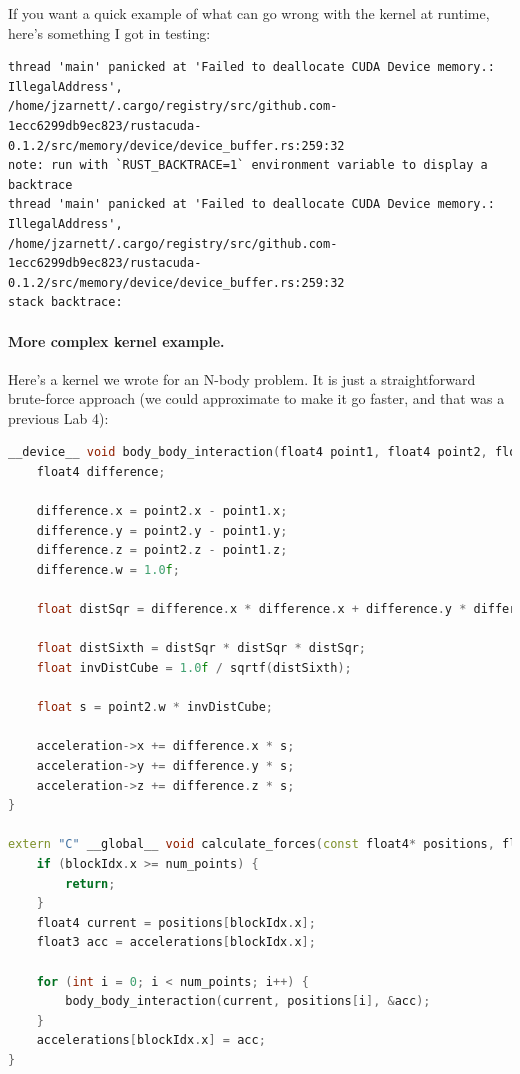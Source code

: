 \documentclass[a4paper]{report}
\begin{document}
If you want a quick example of what can go wrong with the kernel at runtime, here's something I got in testing:
{\scriptsize
\begin{verbatim}
thread 'main' panicked at 'Failed to deallocate CUDA Device memory.: IllegalAddress', 
/home/jzarnett/.cargo/registry/src/github.com-1ecc6299db9ec823/rustacuda-0.1.2/src/memory/device/device_buffer.rs:259:32
note: run with `RUST_BACKTRACE=1` environment variable to display a backtrace
thread 'main' panicked at 'Failed to deallocate CUDA Device memory.: IllegalAddress', 
/home/jzarnett/.cargo/registry/src/github.com-1ecc6299db9ec823/rustacuda-0.1.2/src/memory/device/device_buffer.rs:259:32
stack backtrace:
\end{verbatim}
}

\paragraph{More complex kernel example.} Here's a kernel we wrote for an N-body problem. It is just a straightforward brute-force approach (we could approximate to make it go faster, and that was a previous Lab 4):

\begin{lstlisting}[language=C++]
__device__ void body_body_interaction(float4 point1, float4 point2, float3 *acceleration) {
    float4 difference;

    difference.x = point2.x - point1.x;
    difference.y = point2.y - point1.y;
    difference.z = point2.z - point1.z;
    difference.w = 1.0f;

    float distSqr = difference.x * difference.x + difference.y * difference.y + difference.z * difference.z + 1e-10;

    float distSixth = distSqr * distSqr * distSqr;
    float invDistCube = 1.0f / sqrtf(distSixth);

    float s = point2.w * invDistCube;

    acceleration->x += difference.x * s;
    acceleration->y += difference.y * s;
    acceleration->z += difference.z * s;
}

extern "C" __global__ void calculate_forces(const float4* positions, float3* accelerations, int num_points) {
    if (blockIdx.x >= num_points) {
        return;
    }
    float4 current = positions[blockIdx.x];
    float3 acc = accelerations[blockIdx.x];

    for (int i = 0; i < num_points; i++) {
        body_body_interaction(current, positions[i], &acc);
    }
    accelerations[blockIdx.x] = acc;
}
\end{lstlisting}
\end{document}
